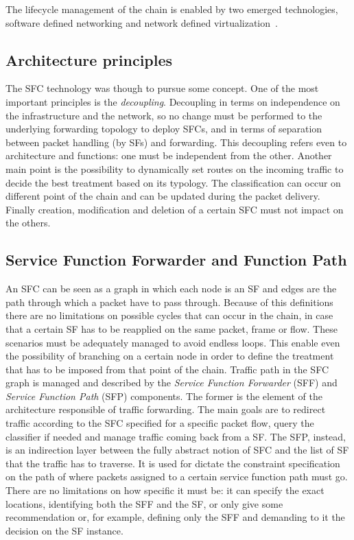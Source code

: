 The lifecycle management of the chain is enabled by two emerged technologies,
software defined networking and network defined
virtualization~\cite{medhat2017service}.

\subsection{Architecture principles}
The SFC technology was though to pursue some concept. One of the most important
principles is the \emph{decoupling}. Decoupling in terms on independence on the
infrastructure and the network, so no change must be performed to the
underlying forwarding topology to deploy SFCs, and in terms of separation
between packet handling (by SFs) and forwarding. This decoupling refers even to
architecture and functions: one must be independent from the other. Another main
point is the possibility to dynamically set routes on the incoming traffic to
decide the best treatment based on its typology. The classification can occur on
different point of the chain and can be updated during the packet delivery.
Finally creation, modification and deletion of a certain SFC must not impact on
the others.

\subsection{Service Function Forwarder and Function Path}
An SFC can be seen as a graph in which each node is an SF and edges are the path
through which a packet have to pass through. Because of this definitions there
are no limitations on possible cycles that can occur in the chain, in case that
a certain SF has to be reapplied on the same packet, frame or flow. These
scenarios must be adequately managed to avoid endless loops. This enable even
the possibility of branching on a certain node in order to define the treatment
that has to be imposed from that point of the chain. Traffic path in the SFC
graph is managed and described by the \emph{Service Function Forwarder} (SFF)
and \emph{Service Function Path} (SFP) components. The former is the element of
the architecture responsible of traffic forwarding. The main goals are to
redirect traffic according to the SFC specified for a specific packet flow,
query the classifier if needed and manage traffic coming back from a SF. The
SFP, instead, is an indirection layer between the fully abstract notion of SFC
and the list of SF that the traffic has to traverse. It is used for dictate the
constraint specification on the path of where packets assigned to a certain
service function path must go. There are no limitations on how specific it must
be: it can specify the exact locations, identifying both the SFF and the SF, or
only give some recommendation or, for example, defining only the SFF and
demanding to it the decision on the SF instance.

